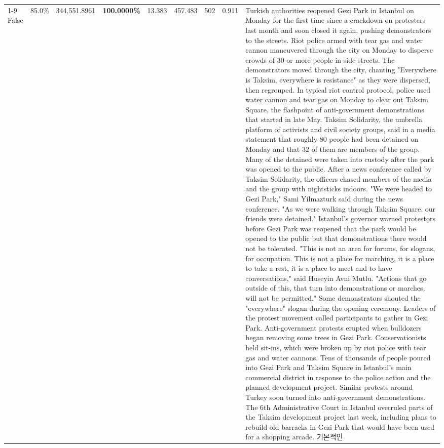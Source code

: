 \begin{table}[H]
\begin{tabular}{lllrlllll}
\cline{1-9}
False & 85.0\% & 344,551.8961 & \bfseries \color{red} 100.0000\% & 13.383 & 457.483 & 502 & 0.911 & Turkish authorities reopened Gezi Park in Istanbul on Monday for the first time since a crackdown on protesters last month and soon closed it again, pushing demonstrators to the streets. Riot police armed with tear gas and water cannon maneuvered through the city on Monday to disperse crowds of 30 or more people in side streets. The demonstrators moved through the city, chanting "Everywhere is Taksim, everywhere is resistance" as they were dispersed, then regrouped. In typical riot control protocol, police used water cannon and tear gas on Monday to clear out Taksim Square, the flashpoint of anti-government demonstrations that started in late May. Taksim Solidarity, the umbrella platform of activists and civil society groups, said in a media statement that roughly 80 people had been detained on Monday and that 32 of them are members of the group. Many of the detained were taken into custody after the park was opened to the public. After a news conference called by Taksim Solidarity, the officers chased members of the media and the group with nightsticks indoors. "We were headed to Gezi Park," Sami Yilmazturk said during the news conference. "As we were walking through Taksim Square, our friends were detained." Istanbul's governor warned protestors before Gezi Park was reopened that the park would be opened to the public but that demonstrations there would not be tolerated. "This is not an area for forums, for slogans, for occupation. This is not a place for marching, it is a place to take a rest, it is a place to meet and to have conversations," said Huseyin Avni Mutlu. "Actions that go outside of this, that turn into demonstrations or marches, will not be permitted." Some demonstrators shouted the "everywhere" slogan during the opening ceremony. Leaders of the protest movement called participants to gather in Gezi Park. Anti-government protests erupted when bulldozers began removing some trees in Gezi Park. Conservationists held sit-ins, which were broken up by riot police with tear gas and water cannons. Tens of thousands of people poured into Gezi Park and Taksim Square in Istanbul's main commercial district in response to the police action and the planned development project. Similar protests around Turkey soon turned into anti-government demonstrations. The 6th Administrative Court in Istanbul overruled parts of the Taksim development project last week, including plans to rebuild old barracks in Gezi Park that would have been used for a shopping arcade. 기본적인 \\

\end{tabular}
\end{table}
